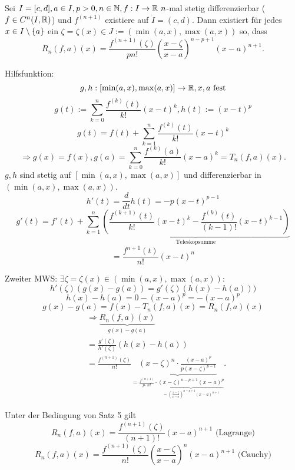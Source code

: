 \documentclass[../ana2.tex]{subfiles}
\begin{document}
\begin{satz}
    Sei \(I = [c,d], \\
    a \in I, p > 0, n \in \mathbb{N}, 
    f:I\rightarrow \mathbb{R}\ n\)-mal stetig differenzierbar 
    (\( f \in C^n(I,\mathbb{R}) \)) und \( f^{(n+1)} \) 
    existiere auf \( \dot{I} = (c,d) \). Dann existiert für 
    jedes \( x\in I \setminus \{a\} \) ein 
    \( \zeta = \zeta(x) \in J := (\min(a,x), \max(a,x)) \) 
    so, dass     
    \[ R_n(f,a)(x) = \frac{f^{(n+1)}(\zeta)}{ pn! } 
    \left( \frac{x - \zeta}{x - a} \right)^{n-p+1} (x-a)^{n+1}. \]
\end{satz}
\begin{bew}
    Hilfsfunktion: 
    \[ g,h:[\min(a,x), \max(a,x)]\rightarrow \mathbb{R}, x,a \text{ fest} \]
    \[ g(t) := \sum_{k=0}^n \frac{f^{(k)}(t)}{k!} (x-t)^k, 
    h(t) := (x-t)^p \]
    \[ g(t) = f(t) + \sum_{k=1}^n \frac{f^{(k)}(t)}{k!} (x-t)^k \]
    \[ \Rightarrow g(x) = f(x), 
    g(a) = \sum_{k=0}^n \frac{f^{(k)}(a)}{k!} 
    (x-a)^k = T_n(f,a)(x).\]
    \( g, h \) sind stetig auf \( [\min(a,x), \max(a,x)] \) und
    differenzierbar in \( (\min(a,x), \max(a,x)) \).
    \[ h'(t) = \frac{d}{dt} h(t) = -p(x-t)^{p-1} \]
    \[ g'(t) = f'(t) + \sum_{k=1}^{n} 
    \underbrace{\left( \frac{f^{(k+1)}(t)}{k!} (x-t)^k
    - \frac{f^{(k)}(t)}{(k-1)!} (x-t)^{k-1} \right)}_{\text{Teleskopsumme}} \]
    \[ = \frac{f^{n+1}(t)}{n!}(x-t)^n \]

    Zweiter MWS: \( \exists \zeta = \zeta(x) 
    \in (\min(a,x), \max(a,x)) \):
    \[ h'(\zeta)(g(x) - g(a)) = g'(\zeta)(h(x) - h(a))) \]
    \[ h(x) - h(a) = 0 - (x-a)^p = -(x-a)^p \]
    \[ g(x) - g(a) = f(x) - T_n(f,a)(x) = R_n(f,a)(x) \]
    \begin{align*}
        &\Rightarrow \underbrace{R_n(f,a)(x)}_{g(x)-g(a)} \\
        &= \frac{g'(\zeta)}{h'(\zeta)}(h(x)-h(a)) \\
        &= \frac{f^{(n+1)}(\zeta)}{n!}
        \underbrace{(x-\zeta)^n \cdot \frac{(x-a)^p}{p(x-\zeta)^{p-1}}}_
        {= \frac{f^{(n+1)}}{p \cdot n!} 
        \cdot \underbrace{(x-\zeta)^{n-p+1}(x-a)^p}_
        {= \left( \frac{x-\zeta}{x-a} \right)^{n-p+1} (x-a)^{n+1}}}.
    \end{align*}
\end{bew}
\begin{kor}
    Unter der Bedingung von Satz 5 gilt 
    \[ R_n(f,a)(x) = \frac{f^{(n+1)}(\zeta)}{(n+1)!} (x-a)^{n+1} \text{ (Lagrange)} \]
    \[ R_n(f,a)(x) = \frac{f^{(n+1)}(\zeta)}{n!} 
    \left( \frac{x- \zeta}{x-a} \right)^n (x-a)^{n+1} \text{ (Cauchy)} \]
\end{kor}
\end{document}
